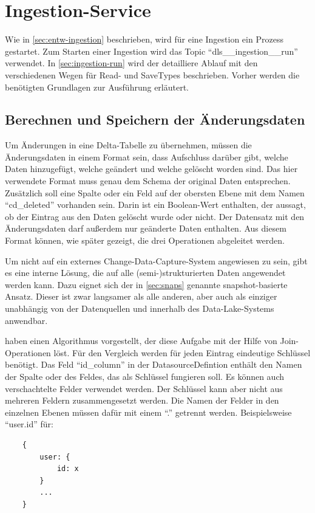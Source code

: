 \section{Ingestion-Service}

Wie in \cref{sec:entw-ingestion} beschrieben, wird für eine Ingestion ein Prozess gestartet.
Zum Starten einer Ingestion wird das Topic "`dls\_\_ingestion\_\_run"' verwendet.
In \cref{sec:ingestion-run} wird der detailliere Ablauf mit den verschiedenen Wegen für Read- und SaveTypes beschrieben.
Vorher werden die benötigten Grundlagen zur Ausführung erläutert.

\subsection{Berechnen und Speichern der Änderungsdaten}
Um Änderungen in eine Delta-Tabelle zu übernehmen, müssen die Änderungsdaten in einem Format sein, dass Aufschluss darüber gibt, welche Daten hinzugefügt, welche geändert und welche gelöscht worden sind.
Das hier verwendete Format muss genau dem Schema der original Daten entsprechen.
Zusätzlich soll eine Spalte oder ein Feld auf der obersten Ebene mit dem Namen "`cd\_deleted"' vorhanden sein.
Darin ist ein Boolean-Wert enthalten, der aussagt, ob der Eintrag aus den Daten gelöscht wurde oder nicht.
Der Datensatz mit den Änderungsdaten darf außerdem nur geänderte Daten enthalten.
Aus diesem Format können, wie später gezeigt, die drei Operationen abgeleitet werden.

Um nicht auf ein externes Change-Data-Capture-System angewiesen zu sein, gibt es eine interne Lösung, die auf alle (semi-)strukturierten Daten angewendet werden kann.
Dazu eignet sich der in \cref{sec:snaps} genannte snapshot-basierte Ansatz.
Dieser ist zwar langsamer als alle anderen, aber auch als einziger unabhängig von der Datenquellen und innerhalb des Data-Lake-Systems anwendbar.

\textcite{snapshot_algos} haben einen Algorithmus vorgestellt, der diese Aufgabe mit der Hilfe von Join-Operationen löst.
Für den Vergleich werden für jeden Eintrag eindeutige Schlüssel benötigt.
Das Feld "`id\_column"' in der DatasourceDefintion enthält den Namen der Spalte oder des Feldes, das als Schlüssel fungieren soll.
Es können auch verschachtelte Felder verwendet werden.
Der Schlüssel kann aber nicht aus mehreren Feldern zusammengesetzt werden.
Die Namen der Felder in den einzelnen Ebenen müssen dafür mit einem "`."' getrennt werden.
Beispielsweise "`user.id"' für: \begin{verbatim}
    {
        user: { 
            id: x 
        }
        ...
    }
\end{verbatim}

